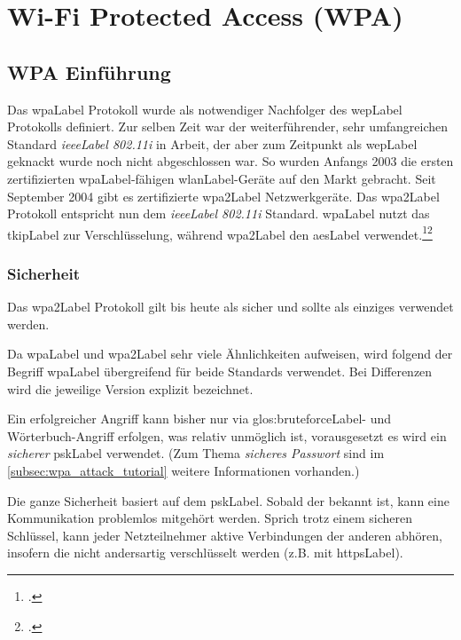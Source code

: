 \chapter{Wi-Fi Protected Access (WPA)}
\label{ch:wpa}

\section{WPA Einführung}
Das \gls{wpaLabel} Protokoll wurde als notwendiger Nachfolger des \gls{wepLabel} Protokolls definiert.
Zur selben Zeit war der weiterführender, sehr umfangreichen Standard \textit{\gls{ieeeLabel} 802.11i} in Arbeit, der aber zum Zeitpunkt als \gls{wepLabel} geknackt wurde noch nicht abgeschlossen war.
So wurden Anfangs 2003 die ersten zertifizierten \gls{wpaLabel}-fähigen \gls{wlanLabel}-Geräte auf den Markt gebracht.
Seit September 2004 gibt es zertifizierte \gls{wpa2Label} Netzwerkgeräte. Das \gls{wpa2Label} Protokoll entspricht nun dem \textit{\gls{ieeeLabel} 802.11i} Standard.
\gls{wpaLabel} nutzt das \gls{tkipLabel} zur Verschlüsselung, während \gls{wpa2Label} den \gls{aesLabel} verwendet.\footcite{Wi-Fi_Protected_Access__Wikipedia_2015-04-10}\footcite{WPA2__Wikipedia_2015-04-10}

\subsection{Sicherheit}
Das \gls{wpa2Label} Protokoll gilt bis heute als sicher und sollte als einziges verwendet werden.

Da \gls{wpaLabel} und \gls{wpa2Label} sehr viele Ähnlichkeiten aufweisen, wird folgend der Begriff \gls{wpaLabel} übergreifend für beide Standards verwendet. Bei Differenzen wird die jeweilige Version explizit bezeichnet.

Ein erfolgreicher Angriff kann bisher nur via \gls{glos:bruteforceLabel}- und Wörterbuch-Angriff erfolgen, was relativ unmöglich ist, vorausgesetzt es wird ein \textit{sicherer} \gls{pskLabel} verwendet. (Zum Thema \textit{sicheres Passwort} sind im \cref{subsec:wpa_attack_tutorial} weitere Informationen vorhanden.)


Die ganze Sicherheit basiert auf dem \gls{pskLabel}.
Sobald der bekannt ist, kann eine Kommunikation problemlos mitgehört werden.
Sprich trotz einem sicheren Schlüssel, kann jeder Netzteilnehmer aktive Verbindungen der anderen abhören, insofern die nicht andersartig verschlüsselt werden (z.B. mit \gls{httpsLabel}).



